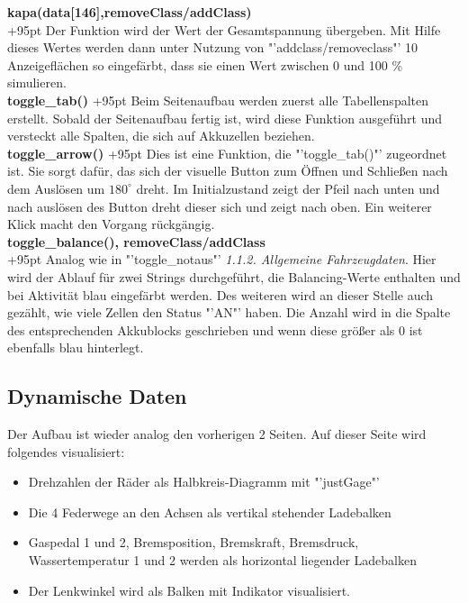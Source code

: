 \documentclass[fontsize = 12pt, paper = a4]{scrreprt}
\begin{document}
\textbf{kapa(data[146],removeClass/addClass)}\\
\hangindent+95pt  
Der Funktion wird der Wert der Gesamtspannung übergeben. Mit Hilfe dieses Wertes werden dann unter Nutzung von "'addclass/removeclass"' 10 Anzeigeflächen so eingefärbt, dass sie einen Wert zwischen 0 und 100 \% simulieren.\\

\textbf{toggle\_tab()}
\hspace{5.8mm}
\hangindent+95pt  
Beim Seitenaufbau werden zuerst alle Tabellenspalten erstellt. Sobald der Seitenaufbau fertig ist, wird diese Funktion ausgeführt und versteckt alle Spalten, die sich auf Akkuzellen beziehen.\\

\textbf{toggle\_arrow()}
\hspace{1mm}
\hangindent+95pt  
Dies ist eine Funktion, die "'toggle\_tab()"' zugeordnet ist. Sie sorgt dafür, das sich der visuelle Button zum Öffnen und Schließen nach dem Auslösen um $180^\circ$  dreht. Im Initialzustand zeigt der Pfeil nach unten und nach auslösen des Button dreht dieser sich und zeigt nach oben. Ein weiterer Klick macht den Vorgang rückgängig.\\


\textbf{toggle\_balance(), removeClass/addClass}\\
\hangindent+95pt  
Analog wie in "'toggle\_notaus"' \textit{1.1.2. Allgemeine Fahrzeugdaten}. Hier wird der Ablauf für zwei Strings durchgeführt, die Balancing-Werte enthalten und bei Aktivität blau eingefärbt werden. Des weiteren wird an dieser Stelle auch gezählt, wie viele Zellen den Status "'AN"' haben. Die Anzahl wird in die Spalte des entsprechenden Akkublocks geschrieben und wenn diese größer als 0 ist ebenfalls blau hinterlegt.\\




\subsection{Dynamische Daten}
Der Aufbau ist wieder analog den vorherigen 2 Seiten. Auf dieser Seite wird folgendes visualisiert: 

\begin{itemize}
\item Drehzahlen der Räder als Halbkreis-Diagramm mit "'justGage"'
\item Die 4 Federwege an den Achsen als vertikal stehender Ladebalken 
\item Gaspedal 1 und 2, Bremsposition, Bremskraft, Bremsdruck, Wassertemperatur 1 und 2 werden als horizontal liegender Ladebalken 
\item Der Lenkwinkel wird als Balken mit Indikator visualisiert.  
\end{itemize}
\end{document}
